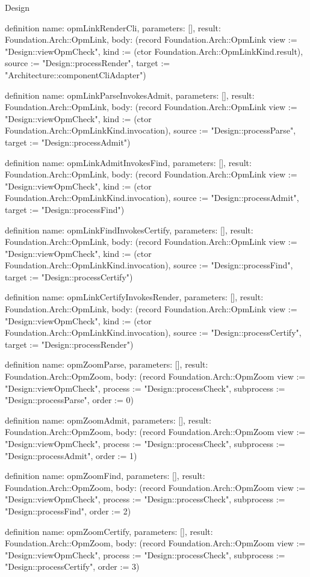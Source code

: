 \begin{lexlean}{Design}
\begin{semanticmodule}
definition{
  name: opmLinkRenderCli,
  parameters: [],
  result: Foundation.Arch::OpmLink,
  body: (record Foundation.Arch::OpmLink {view := "Design::viewOpmCheck", kind := (ctor Foundation.Arch::OpmLinkKind.result), source := "Design::processRender", target := "Architecture::componentCliAdapter"})
}

definition{
  name: opmLinkParseInvokesAdmit,
  parameters: [],
  result: Foundation.Arch::OpmLink,
  body: (record Foundation.Arch::OpmLink {view := "Design::viewOpmCheck", kind := (ctor Foundation.Arch::OpmLinkKind.invocation), source := "Design::processParse", target := "Design::processAdmit"})
}

definition{
  name: opmLinkAdmitInvokesFind,
  parameters: [],
  result: Foundation.Arch::OpmLink,
  body: (record Foundation.Arch::OpmLink {view := "Design::viewOpmCheck", kind := (ctor Foundation.Arch::OpmLinkKind.invocation), source := "Design::processAdmit", target := "Design::processFind"})
}

definition{
  name: opmLinkFindInvokesCertify,
  parameters: [],
  result: Foundation.Arch::OpmLink,
  body: (record Foundation.Arch::OpmLink {view := "Design::viewOpmCheck", kind := (ctor Foundation.Arch::OpmLinkKind.invocation), source := "Design::processFind", target := "Design::processCertify"})
}

definition{
  name: opmLinkCertifyInvokesRender,
  parameters: [],
  result: Foundation.Arch::OpmLink,
  body: (record Foundation.Arch::OpmLink {view := "Design::viewOpmCheck", kind := (ctor Foundation.Arch::OpmLinkKind.invocation), source := "Design::processCertify", target := "Design::processRender"})
}

definition{
  name: opmZoomParse,
  parameters: [],
  result: Foundation.Arch::OpmZoom,
  body: (record Foundation.Arch::OpmZoom {view := "Design::viewOpmCheck", process := "Design::processCheck", subprocess := "Design::processParse", order := 0})
}

definition{
  name: opmZoomAdmit,
  parameters: [],
  result: Foundation.Arch::OpmZoom,
  body: (record Foundation.Arch::OpmZoom {view := "Design::viewOpmCheck", process := "Design::processCheck", subprocess := "Design::processAdmit", order := 1})
}

definition{
  name: opmZoomFind,
  parameters: [],
  result: Foundation.Arch::OpmZoom,
  body: (record Foundation.Arch::OpmZoom {view := "Design::viewOpmCheck", process := "Design::processCheck", subprocess := "Design::processFind", order := 2})
}

definition{
  name: opmZoomCertify,
  parameters: [],
  result: Foundation.Arch::OpmZoom,
  body: (record Foundation.Arch::OpmZoom {view := "Design::viewOpmCheck", process := "Design::processCheck", subprocess := "Design::processCertify", order := 3})
}


\end{semanticmodule}
\end{lexlean}
